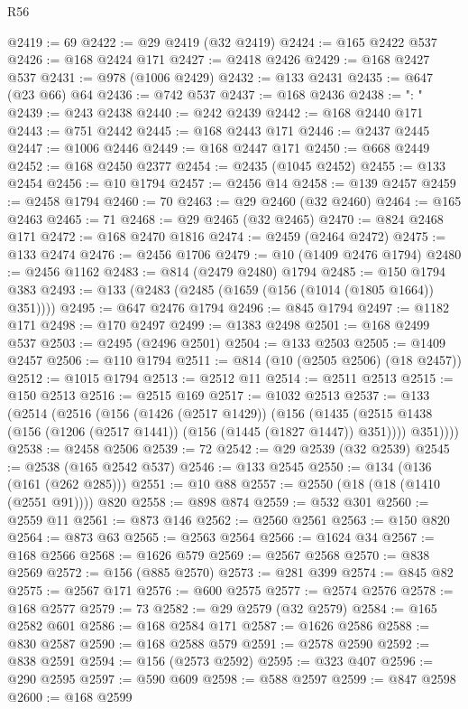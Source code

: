 \begin{lexlean}{R56}
\begin{coremodule}
{{{{{{{{{{{{{{{{{{{{{{{{{{{{{{{{{{{{{{{{{{{{{{{{{{{{{{{{{{{{{{{{{{{{{{{{{{{{{{{{{{{{{{{{{{{{{{{{{{{{{{{{{{{{{{{{{{{{{{{{{{{{{{{{{{{{{{{{{{{{{{{{{{{{{{{{{{{{{{{{{{{{{{{{{{{{{{{{{{{{{{{{{{{{{{{{{{{{{{{{{{{{{{{{{{{@2419 := 69
@2422 := @29 @2419 (@32 @2419)
@2424 := @165 @2422 @537
@2426 := @168 @2424 @171
@2427 := @2418 @2426
@2429 := @168 @2427 @537
@2431 := @978 (@1006 @2429)
@2432 := @133 @2431
@2435 := @647 (@23 @66) @64
@2436 := @742 @537
@2437 := @168 @2436
@2438 := ": "
@2439 := @243 @2438
@2440 := @242 @2439
@2442 := @168 @2440 @171
@2443 := @751 @2442
@2445 := @168 @2443 @171
@2446 := @2437 @2445
@2447 := @1006 @2446
@2449 := @168 @2447 @171
@2450 := @668 @2449
@2452 := @168 @2450 @2377
@2454 := @2435 (@1045 @2452)
@2455 := @133 @2454
@2456 := @10 @1794
@2457 := @2456 @14
@2458 := @139 @2457
@2459 := @2458 @1794
@2460 := 70
@2463 := @29 @2460 (@32 @2460)
@2464 := @165 @2463
@2465 := 71
@2468 := @29 @2465 (@32 @2465)
@2470 := @824 @2468 @171
@2472 := @168 @2470 @1816
@2474 := @2459 (@2464 @2472)
@2475 := @133 @2474
@2476 := @2456 @1706
@2479 := @10 (@1409 @2476 @1794)
@2480 := @2456 @1162
@2483 := @814 (@2479 @2480) @1794
@2485 := @150 @1794 @383
@2493 := @133 (@2483 (@2485 (@1659 (@156 (@1014 (@1805 @1664)) @351))))
@2495 := @647 @2476 @1794
@2496 := @845 @1794
@2497 := @1182 @171
@2498 := @170 @2497
@2499 := @1383 @2498
@2501 := @168 @2499 @537
@2503 := @2495 (@2496 @2501)
@2504 := @133 @2503
@2505 := @1409 @2457
@2506 := @110 @1794
@2511 := @814 (@10 (@2505 @2506) (@18 @2457))
@2512 := @1015 @1794
@2513 := @2512 @11
@2514 := @2511 @2513
@2515 := @150 @2513
@2516 := @2515 @169
@2517 := @1032 @2513
@2537 := @133
    (@2514
      (@2516
        (@156
          (@1426 (@2517 @1429))
          (@156
            (@1435 (@2515 @1438 (@156 (@1206 (@2517 @1441)) (@156 (@1445 (@1827 @1447)) @351))))
            @351))))
@2538 := @2458 @2506
@2539 := 72
@2542 := @29 @2539 (@32 @2539)
@2545 := @2538 (@165 @2542 @537)
@2546 := @133 @2545
@2550 := @134 (@136 (@161 (@262 @285)))
@2551 := @10 @88
@2557 := @2550 (@18 (@18 (@1410 (@2551 @91)))) @820
@2558 := @898 @874
@2559 := @532 @301
@2560 := @2559 @11
@2561 := @873 @146
@2562 := @2560 @2561
@2563 := @150 @820
@2564 := @873 @63
@2565 := @2563 @2564
@2566 := @1624 @34
@2567 := @168 @2566
@2568 := @1626 @579
@2569 := @2567 @2568
@2570 := @838 @2569
@2572 := @156 (@885 @2570)
@2573 := @281 @399
@2574 := @845 @82
@2575 := @2567 @171
@2576 := @600 @2575
@2577 := @2574 @2576
@2578 := @168 @2577
@2579 := 73
@2582 := @29 @2579 (@32 @2579)
@2584 := @165 @2582 @601
@2586 := @168 @2584 @171
@2587 := @1626 @2586
@2588 := @830 @2587
@2590 := @168 @2588 @579
@2591 := @2578 @2590
@2592 := @838 @2591
@2594 := @156 (@2573 @2592)
@2595 := @323 @407
@2596 := @290 @2595
@2597 := @590 @609
@2598 := @588 @2597
@2599 := @847 @2598
@2600 := @168 @2599
}}}}}}}}}}}}}}}}}}}}}}}}}}}}}}}}}}}}}}}}}}}}}}}}}}}}}}}}}}}}}}}}}}}}}}}}}}}}}}}}}}}}}}}}}}}}}}}}}}}}}}}}}}}}}}}}}}}}}}}}}}}}}}}}}}}}}}}}}}}}}}}}}}}}}}}}}}}}}}}}}}}}}}}}}}}}}}}}}}}}}}}}}}}}}}}}}}}}}}}}}}}}}}}}}}}
\end{coremodule}
\end{lexlean}
